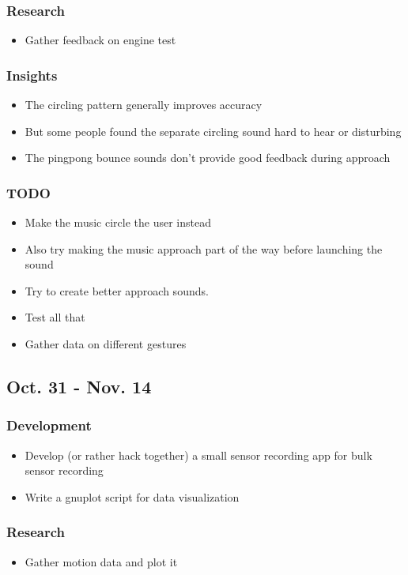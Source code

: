 \documentclass{article}
\begin{document}
\subsubsection{Research}
\begin{itemize}
    \item Gather feedback on engine test
\end{itemize}
\subsubsection{Insights}
\begin{itemize}
    \item The circling pattern generally improves accuracy
    \item But some people found the separate circling sound hard to hear or disturbing
    \item The pingpong bounce sounds don't provide good feedback during approach
\end{itemize}
\subsubsection{TODO}
\begin{itemize}
    \item Make the music circle the user instead
    \item Also try making the music approach part of the way before launching the sound
    \item Try to create better approach sounds.
    \item Test all that
    \item Gather data on different gestures
\end{itemize}
\subsection{Oct. 31 - Nov. 14}
\subsubsection{Development}
\begin{itemize}
    \item Develop (or rather hack together) a small sensor recording app for bulk sensor recording
    \item Write a gnuplot script for data visualization
\end{itemize}
\subsubsection{Research}
\begin{itemize}
    \item Gather motion data and plot it
\end{itemize}
\end{document}
